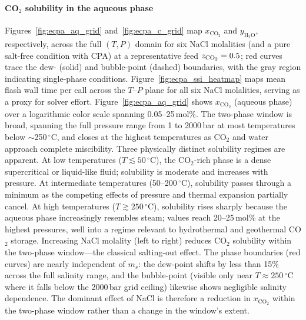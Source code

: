 \documentclass[preprint,12pt,number]{elsarticle}
\begin{document}
\paragraph{CO$_2$ solubility in the aqueous phase}
Figures~\ref{fig:ecpa_aq_grid} and~\ref{fig:ecpa_c_grid} map $x_{\text{CO}_2}$ and
$y_{\text{H}_2\text{O}}$, respectively, across the full $(T, P)$ domain for six NaCl molalities (and a pure salt-free condition with CPA)
at a representative feed $z_{\rm CO_2} = 0.5$; red curves trace the dew- (solid) and bubble-point (dashed) boundaries,
with the gray region indicating single-phase conditions.
Figure~\ref{fig:ecpa_ssi_heatmap} maps mean flash wall time per call
across the $T$--$P$ plane for all six NaCl molalities, serving as a proxy for
solver effort.
Figure~\ref{fig:ecpa_aq_grid} shows $x_{\text{CO}_2}$ (aqueous phase) over a
logarithmic color scale spanning 0.05--25\,mol\%.
The two-phase window is broad, spanning the full pressure range from 1 to
2000\,bar at most temperatures below $\sim$250\,$^\circ$C, and closes at the highest
temperatures as CO$_2$ and water approach complete miscibility.
Three physically distinct solubility regimes are apparent.
At low temperatures ($T \lesssim 50\,^\circ$C), the CO$_2$-rich phase is a dense
supercritical or liquid-like fluid; solubility is moderate and increases with pressure.
At intermediate temperatures (50--200\,$^\circ$C), solubility passes through a minimum
as the competing effects of pressure and thermal expansion partially cancel.
At high temperatures ($T \gtrsim 250\,^\circ$C), solubility rises sharply because the
aqueous phase increasingly resembles steam; values reach 20--25\,mol\% at the highest
pressures, well into a regime relevant to hydrothermal and geothermal CO$_2$ storage.
Increasing NaCl molality (left to right) reduces CO$_2$ solubility within the
two-phase window---the classical salting-out effect.
The phase boundaries (red curves) are nearly independent of $m_s$: the dew-point
shifts by less than 15\% across the full salinity range,
and the bubble-point (visible only near $T \approx 250\,^\circ$C where it falls below
the 2000\,bar grid ceiling) likewise shows negligible salinity dependence.
The dominant effect of NaCl is therefore a reduction in $x_{\text{CO}_2}$ within the
two-phase window rather than a change in the window's extent.
\end{document}
